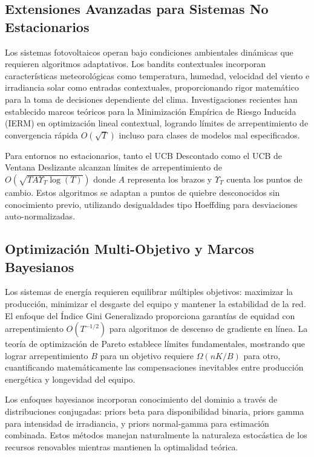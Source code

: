 \documentclass[conference]{IEEEtran}
\begin{document}
\subsection{Extensiones Avanzadas para Sistemas No Estacionarios}

Los sistemas fotovoltaicos operan bajo condiciones ambientales dinámicas que requieren algoritmos adaptativos. Los bandits contextuales incorporan características meteorológicas como temperatura, humedad, velocidad del viento e irradiancia solar como entradas contextuales, proporcionando rigor matemático para la toma de decisiones dependiente del clima. Investigaciones recientes han establecido marcos teóricos para la Minimización Empírica de Riesgo Inducida (IERM) en optimización lineal contextual, logrando límites de arrepentimiento de convergencia rápida $O(\sqrt{T})$ incluso para clases de modelos mal especificados.

Para entornos no estacionarios, tanto el UCB Descontado como el UCB de Ventana Deslizante alcanzan límites de arrepentimiento de $O(\sqrt{TA\Upsilon_T \log(T)})$ donde $A$ representa los brazos y $\Upsilon_T$ cuenta los puntos de cambio. Estos algoritmos se adaptan a puntos de quiebre desconocidos sin conocimiento previo, utilizando desigualdades tipo Hoeffding para desviaciones auto-normalizadas.

\subsection{Optimización Multi-Objetivo y Marcos Bayesianos}

Los sistemas de energía requieren equilibrar múltiples objetivos: maximizar la producción, minimizar el desgaste del equipo y mantener la estabilidad de la red. El enfoque del Índice Gini Generalizado proporciona garantías de equidad con arrepentimiento $O(T^{-1/2})$ para algoritmos de descenso de gradiente en línea. La teoría de optimización de Pareto establece límites fundamentales, mostrando que lograr arrepentimiento $B$ para un objetivo requiere $\Omega(nK/B)$ para otro, cuantificando matemáticamente las compensaciones inevitables entre producción energética y longevidad del equipo.

Los enfoques bayesianos incorporan conocimiento del dominio a través de distribuciones conjugadas: priors beta para disponibilidad binaria, priors gamma para intensidad de irradiancia, y priors normal-gamma para estimación combinada. Estos métodos manejan naturalmente la naturaleza estocástica de los recursos renovables mientras mantienen la optimalidad teórica.
\end{document}
